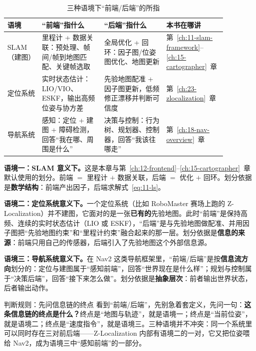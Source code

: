 \begin{table}[htbp]
  \centering
  \caption{三种语境下``前端/后端''的所指}\label{tab:11-contexts}
  \footnotesize
  \begin{tabular}{p{0.15\linewidth}p{0.27\linewidth}p{0.27\linewidth}p{0.19\linewidth}}
    \toprule
    语境 & ``前端''指什么 & ``后端''指什么 & 本书在哪讲 \\
    \midrule
    SLAM（建图） & 里程计 + 数据关联：预处理、帧间/帧到地图匹配、关键帧选取 & 全局优化 + 回环：因子图/位姿图优化、地图更新 & 第~\ref{ch:11-slam-framework}--\ref{ch:15-cartographer}~章 \\
    定位系统 & 实时状态估计：LIO/VIO、ESKF，输出高频位姿与协方差 & 先验地图配准 + 因子图更新，低频修正漂移并判断可信度 & 第~\ref{ch:23-zlocalization}~章 \\
    导航系统 & 感知：定位 + 建图 + 障碍检测，回答``我在哪、周围是什么'' & 决策与控制：行为树、规划器、控制器，回答``我该往哪走'' & 第~\ref{ch:18-nav-overview}~章 \\
    \bottomrule
  \end{tabular}
\end{table}

\textbf{语境一：SLAM 意义下。}这是本章与第~\ref{ch:12-frontend}--\ref{ch:15-cartographer}~章默认使用的划分。前端 $=$ 里程计 $+$ 数据关联，后端 $=$ 优化 $+$ 回环。划分依据是\textbf{数学结构}：前端产出因子，后端求解式~\eqref{eq:11-ls}。

\textbf{语境二：定位系统意义下。}一个定位系统（比如 RoboMaster 赛场上跑的 Z-Localization）并不建图，它面对的是一张\textbf{已有的}先验地图。此时``前端''是保持高频、连续的实时状态估计（LIO 或 ESKF），``后端''是与先验地图做配准、并用因子图把``先验地图约束''和``里程计约束''融合起来的那一层。划分依据是\textbf{信息的来源}：前端只用自己的传感器，后端引入了先验地图这个外部信息源。

\textbf{语境三：导航系统意义下。}在 Nav2 这类导航框架里，``前端/后端''是按\textbf{信息流方向}划分的：定位与建图属于``感知前端''，回答``世界现在是什么样''；规划与控制属于``决策后端''，回答``接下来怎么做''。划分依据是\textbf{抽象层次}：前者输出世界状态，后者输出动作。

\begin{keybox}{判断规则：先问信息链的终点}
看到``前端/后端''，先别急着套定义，先问一句：\textbf{这条信息链的终点是什么？}终点是``地图与轨迹''，就是语境一；终点是``当前位姿''，就是语境二；终点是``速度指令''，就是语境三。三种语境并不冲突：同一个系统里可以同时存在三对前后端——Z-Localization 内部有语境二的一对，它又把位姿喂给 Nav2，成为语境三中``感知前端''的一部分。
\end{keybox}

